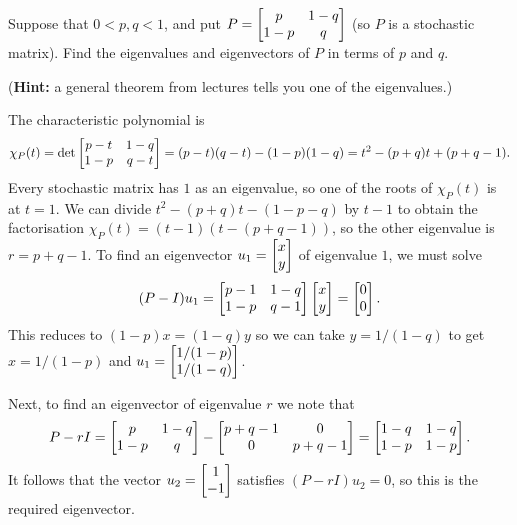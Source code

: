\documentclass[a4paper]{amsart}
\renewenvironment{solution}{\SolutionInline}{\endSolutionInline}
\begin{document}
\begin{exercise}\label{ex-stochastic-ii}
 Suppose that $0<p,q<1$, and put $P=\left[\begin{matrix} p& 1-q \\ 1-p & q\end{matrix}\right]$ (so
 $P$ is a stochastic matrix).  Find the eigenvalues and eigenvectors
 of $P$ in terms of $p$ and $q$.  

 (\textbf{Hint:} a general theorem from lectures tells you one of the
 eigenvalues.) 
\end{exercise}
\begin{solution}
 The characteristic polynomial is
 \[ \chi_P(t) = \det\left[\begin{matrix} p-t & 1-q \\ 1-p & q-t \end{matrix}\right] =
     (p-t)(q-t)-(1-p)(1-q) = t^2-(p+q)t + (p+q-1).
 \]
 Every stochastic matrix has $1$ as an eigenvalue, so one of the roots
 of $\chi_P(t)$ is at $t=1$.  We can divide $t^2-(p+q)t - (1-p-q)$ by
 $t-1$ to obtain the factorisation $\chi_P(t)=(t-1)(t-(p+q-1))$, so
 the other eigenvalue is $r=p+q-1$.  To find an eigenvector
 $u_1=\left[\begin{matrix} x\\ y\end{matrix}\right]$ of eigenvalue $1$, we must solve 
 \[ (P-I)u_1 = \left[\begin{matrix} p-1 & 1-q \\ 1-p & q-1\end{matrix}\right] \left[\begin{matrix} x\\ y\end{matrix}\right] 
     = \left[\begin{matrix} 0\\ 0\end{matrix}\right].
 \]
 This reduces to $(1-p)x=(1-q)y$ so we can take $y=1/(1-q)$ to get
 $x=1/(1-p)$ and $u_1=\left[\begin{matrix} 1/(1-p)\\ 1/(1-q)\end{matrix}\right]$.

 Next, to find an eigenvector of eigenvalue $r$ we note that 
 \[ P-rI = \left[\begin{matrix} p & 1-q \\ 1-p & q \end{matrix}\right] -
           \left[\begin{matrix} p+q-1 & 0 \\ 0 & p+q-1 \end{matrix}\right] 
    = \left[\begin{matrix} 1-q & 1-q \\ 1-p & 1-p \end{matrix}\right].
 \]
 It follows that the vector $u_2=\left[\begin{matrix} 1\\ -1\end{matrix}\right]$ satisfies
 $(P-rI)u_2=0$, so this is the required eigenvector.
\end{solution}
\end{document}
